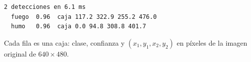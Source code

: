 \begin{resultado}
\begin{lstlisting}
2 detecciones en 6.1 ms
  fuego  0.96  caja 117.2 322.9 255.2 476.0
  humo   0.96  caja 0.0 94.8 308.8 401.7
\end{lstlisting}
Cada fila es una caja: clase, confianza y $(x_1, y_1, x_2, y_2)$ en píxeles de la imagen
original de $640\times480$.
\end{resultado}
